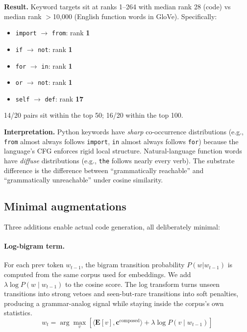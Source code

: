 \documentclass[11pt,a4paper]{article}
\begin{document}
\textbf{Result.} Keyword targets sit at ranks 1--264 with median rank 28 (code) vs median rank $>$10{,}000 (English function words in GloVe). Specifically:
\begin{itemize}
\item \texttt{import} $\rightarrow$ \texttt{from}: rank \textbf{1}
\item \texttt{if} $\rightarrow$ \texttt{not}: rank \textbf{1}
\item \texttt{for} $\rightarrow$ \texttt{in}: rank \textbf{1}
\item \texttt{or} $\rightarrow$ \texttt{not}: rank \textbf{1}
\item \texttt{self} $\rightarrow$ \texttt{def}: rank \textbf{17}
\end{itemize}
14/20 pairs sit within the top 50; 16/20 within the top 100.

\textbf{Interpretation.} Python keywords have \emph{sharp} co-occurrence distributions (e.g., \texttt{from} almost always follows \texttt{import}, \texttt{in} almost always follows \texttt{for}) because the language's CFG enforces rigid local structure. Natural-language function words have \emph{diffuse} distributions (e.g., \texttt{the} follows nearly every verb). The substrate difference is the difference between ``grammatically reachable'' and ``grammatically unreachable'' under cosine similarity.

\subsection{Minimal augmentations}
Three additions enable actual code generation, all deliberately minimal:

\paragraph{Log-bigram term.} For each prev token $w_{t-1}$, the bigram transition probability $P(w | w_{t-1})$ is computed from the same corpus used for embeddings. We add $\lambda \log P(w \mid w_{t-1})$ to the cosine score. The log transform turns unseen transitions into strong vetoes and seen-but-rare transitions into soft penalties, producing a grammar-analog signal while staying inside the corpus's own statistics.
\begin{equation}
w_t = \arg\max_{v} \left[ \langle \mathbf{E}[v], \mathbf{c}^{\text{composed}} \rangle + \lambda \log P(v \mid w_{t-1}) \right]
\end{equation}
\end{document}
